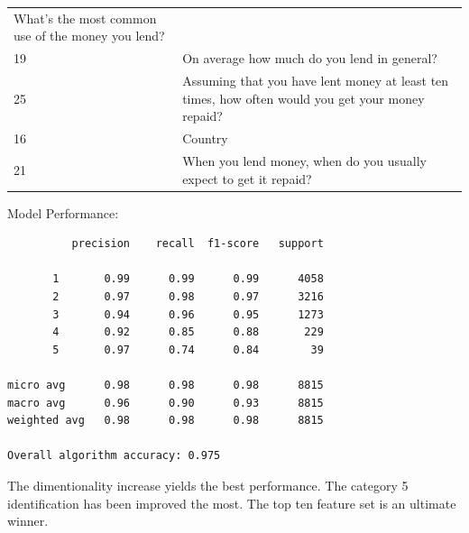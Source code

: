 \begin{longtable}[]{@{}ll@{}}
\begin{minipage}[t]{0.89\columnwidth}
What's the most common use of the money you lend?\strut
\end{minipage}\tabularnewline
\begin{minipage}[t]{0.05\columnwidth}\raggedright
19\strut
\end{minipage} & \begin{minipage}[t]{0.89\columnwidth}\raggedright
On average how much do you lend in general?\strut
\end{minipage}\tabularnewline
\begin{minipage}[t]{0.05\columnwidth}\raggedright
25\strut
\end{minipage} & \begin{minipage}[t]{0.89\columnwidth}\raggedright
Assuming that you have lent money at least ten times, how often would
you get your money repaid?\strut
\end{minipage}\tabularnewline
\begin{minipage}[t]{0.05\columnwidth}\raggedright
16\strut
\end{minipage} & \begin{minipage}[t]{0.89\columnwidth}\raggedright
Country\strut
\end{minipage}\tabularnewline
\begin{minipage}[t]{0.05\columnwidth}\raggedright
21\strut
\end{minipage} & \begin{minipage}[t]{0.89\columnwidth}\raggedright
When you lend money, when do you usually expect to get it repaid?\strut
\end{minipage}\tabularnewline
\bottomrule
\end{longtable}

Model Performance:

\begin{verbatim}
          precision    recall  f1-score   support

       1       0.99      0.99      0.99      4058
       2       0.97      0.98      0.97      3216
       3       0.94      0.96      0.95      1273
       4       0.92      0.85      0.88       229
       5       0.97      0.74      0.84        39

micro avg      0.98      0.98      0.98      8815
macro avg      0.96      0.90      0.93      8815
weighted avg   0.98      0.98      0.98      8815

Overall algorithm accuracy: 0.975
\end{verbatim}

The dimentionality increase yields the best performance. The category 5
identification has been improved the most. The top ten feature set is an
ultimate winner.

